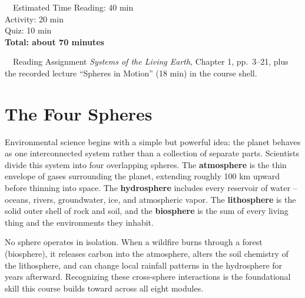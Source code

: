 \documentclass[11pt,a4paper]{scrreprt}
\begin{document}
\begin{center}
\begin{minipage}{0.47\textwidth}
\begin{infobox}{\faClock\ \ Estimated Time}
Reading: 40 min\\
Activity: 20 min\\
Quiz: 10 min\\
\textbf{Total: about 70 minutes}
\end{infobox}
\end{minipage}\hfill
\begin{minipage}{0.47\textwidth}
\begin{infobox}{\faBook\ \ Reading Assignment}
\emph{Systems of the Living Earth}, Chapter 1, pp.\ 3--21, plus the recorded lecture
``Spheres in Motion'' (18 min) in the course shell.
\end{infobox}
\end{minipage}
\end{center}

\section{The Four Spheres}

Environmental science begins with a simple but powerful idea: the planet behaves as one
interconnected system rather than a collection of separate parts. Scientists divide this system
into four overlapping spheres. The \textbf{atmosphere} is the thin envelope of gases surrounding
the planet, extending roughly 100 km upward before thinning into space. The \textbf{hydrosphere}
includes every reservoir of water -- oceans, rivers, groundwater, ice, and atmospheric vapor. The
\textbf{lithosphere} is the solid outer shell of rock and soil, and the \textbf{biosphere} is the
sum of every living thing and the environments they inhabit.

No sphere operates in isolation. When a wildfire burns through a forest (biosphere), it releases
carbon into the atmosphere, alters the soil chemistry of the lithosphere, and can change local
rainfall patterns in the hydrosphere for years afterward. Recognizing these cross-sphere
interactions is the foundational skill this course builds toward across all eight modules.

\begin{center}
\end{center}
\end{document}
